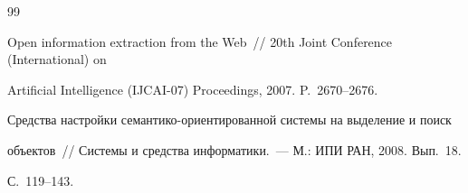 {{\begin{thebibliography}{99}











 Open information extraction from the Web~/\!\!/ 20th Joint Conference (International) on 


Artificial Intelligence (IJCAI-07) Proceedings, 2007. P.~2670--2676.












 Средства настройки семантико-ориентированной системы на выделение и поиск 


объектов~/\!\!/ Системы и средства информатики.~--- М.: ИПИ РАН, 2008.  Вып.~18.


С.~119--143.















 





 \label{end\stat}


 \label{l2-10-end}


 





\end{thebibliography}


}


}    


